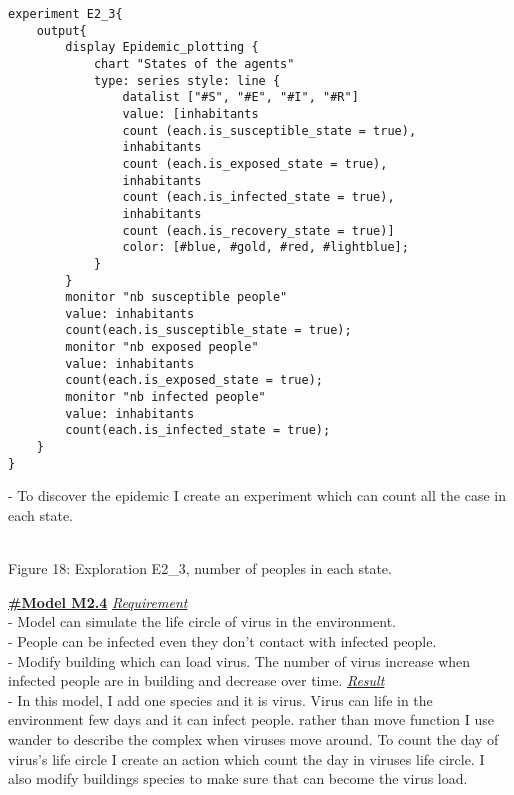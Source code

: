\documentclass{article}
\begin{document}
\begin{pic15}
\begin{pic15}
\begin{tcolorbox}
\begin{lstlisting}
experiment E2_3{
	output{
		display Epidemic_plotting {
			chart "States of the agents" 
			type: series style: line {
				datalist ["#S", "#E", "#I", "#R"] 
				value: [inhabitants 
				count (each.is_susceptible_state = true), 
				inhabitants 
				count (each.is_exposed_state = true), 
				inhabitants 
				count (each.is_infected_state = true), 
				inhabitants 
				count (each.is_recovery_state = true)] 
				color: [#blue, #gold, #red, #lightblue];
			}
		}
		monitor "nb susceptible people" 
		value: inhabitants 
		count(each.is_susceptible_state = true);
		monitor "nb exposed people" 
		value: inhabitants 
		count(each.is_exposed_state = true);
		monitor "nb infected people" 
		value: inhabitants 
		count(each.is_infected_state = true);
	}
}
\end{lstlisting}
\end{tcolorbox}
\newpage
- To discover the epidemic I create an experiment which can count all the case in each state.
\newline\newline
\begin{pic18}
\\
\caption{Figure 18: Exploration E2\_3, number of peoples in each state.} 
\end{pic18}
\newline\newline
\underline{\textbf{#Model M2.4}}
\newline\newline
\underline{\emph{Requirement}}
\\- Model can simulate the life circle of virus in the environment.
\\- People can be infected even they don't contact with infected people.
\\- Modify building which can load virus. The number of virus increase when infected people are in building and decrease over time.
\newline\newline
\underline{\emph{Result}}\\
- In this model, I add one species and it is virus. Virus can life in the environment few days and it can infect people. rather than move function I use wander to describe the complex when viruses move around. To count the day of virus's life circle I create an action which count the day in viruses life circle. I also modify buildings species to make sure that can become the virus load.

\end{pic15}
\end{pic15}
\end{document}
